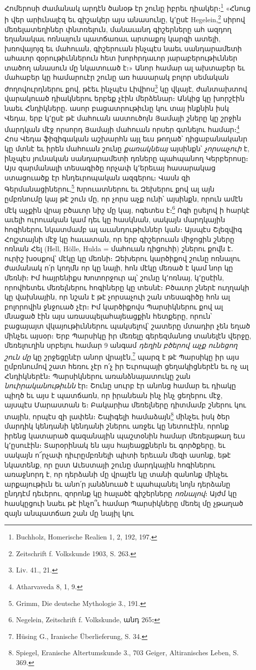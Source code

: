 \documentclass{article}
\begin{document}
{Հոմերոսի ժամանակ արդէն ծանօթ էր շունը իբրեւ դիակեր։\footnote{Buchholz, Homerische Realien 1, 2, 192, 197.} «Հնուց ի վեր արիւնալէզ եւ գիշակեր այս անասունը, կ՚ըսէ Hegelein,\footnote{Zeitschrift f. Volkskunde 1903, S. 263.} սիրով մեռելատեղիներ փնտռելուն, մանաւանդ գիշերները ահ ազդող եղանակաւ ոռնալուն պատճառաւ արտաքոյ կարգի ատելի, խռովայոյզ եւ մահուան, գիշերուան ինչպէս նաեւ սանդարամետի ահաւոր զօրութիւններուն հետ խորհրդաւոր յարաբերութիւններ տածող անասուն մը նկատուած է։» Անոր համար ալ ախտաբեր եւ մահաբեր կը համարուէր շունը առ հասարակ բոլոր սեմական ժողովուրդներու քով, թէեւ ինչպէս Լիվիոս\footnote{Liv. 41., 21.} կը վկայէ, ժանտախտով վարակուած դիակներու երբեք չէին մերձենար։ Անկից կը խորշէին նաեւ Հնդիկները․ ասոր բացատրութիւնը կու տայ ինքնին իսկ Վեդա, երբ կ՚ըսէ թէ մահուան աստուծոյն Յամայի շները կը շրջին մարդկան մէջ որսորդ Յամայի մահուան որսեր գտնելու համար։\footnote{Atharvaveda 8, 1, 9.} Հոս Վեդա ֆիզիգական աշխարհն այլ եւս թողած՝ դիցաբանականր կը մտնէ եւ իրեն մահուան շունը \emph{քառակնեայ} այսինքն՝ \emph{չորսաչուի} է, ինչպէս յունական սանդարամետի դռները պահպանող Կերբերոսը։ Այս զարմանալի տեսագիծը որչափ կ՚երեւայ հասարակաց ստացուածք էր հնդեւրոպական ազգերու։ Վասն զի Գերմանացիներու,\footnote{Grimm, Die deutsche Mythologie 3., 191.} Խրուատներու եւ Զեխերու քով ալ այն ըմբռնումը կայ թէ շուն մը, որ չորս աչք ունի՝ այսինքն, որուն ամէն մէկ աչքին վրայ բծաւոր նիշ մը կայ, ոգետես է։\footnote{Negelein, Zeitschrift f. Volkskunde, անդ 265։} Ոգի ըսելով ի հարկէ աւելի ուրուական կամ դեւ կը հասկնան, սակայն մարդկային հոգիներու նկատմամբ ալ աւանդութիւններ կան։ Այսպէս Շլեզվիգ Հոլշտայնի մէջ կը հաւատան, որ երբ գիշերուան միջոցին շները ոռնան Հել (Hell, Hölle, Hulda = մահուան դիցուհի) շներու քովն է․ ուրիշ խօսքով՝ մէկը կը մեռնի։ Զեխերու կարծիքով շունը ոռնալու ժամանակ ո՛ր կողմն որ կը նայի, հոն մէկը մեռած է կամ նոր կը մեռնի։ Իմ հայրենիքս Խոտորջուր ալ՝ շունը կ՚ոռնայ, կ՚ըսէին, որովհետեւ մեռելներու հոգիները կը տեսնէ։ Բծաւոր շներէ ուղղակի կը վախնային, որ նշան է թէ չորսաչուի շան տեսագիծը հոն ալ բոլորովին ջնջուած չէր։ Իմ կարծիքովս Պարսիկներու քով ալ մնացած էին այս առասպելահայեացքին հետքերը, որուն՝ բացայայտ վկայութիւններու պակսելով՝ շատերը մտադիր չեն եղած մինչեւ այսօր։ Երբ Պարսիկը իր մեռելը գերեզմանոց տանելէն վերջը, մեռելուղին սրբելու համար 9 անգամ \emph{դեղին բծերով աչք ունեցող շուն մը} կը շրջեցընէր անոր վրայէն,\footnote{Hüsing G., Iranische Überlieferung, S. 34.} պարզ է թէ Պարսիկը իր այս ըմբռնումով շատ հեռու չէր ո՛չ իր Եւրոպայի ցեղակիցներէն եւ ոչ ալ Հնդիկներէն։ Պարսիկներու առանձնայատուկը շան \emph{նուիրականութիւնն} էր։ Շունը սուրբ էր անոնց համար եւ դիակը պիղծ եւ այս է պատճառն, որ իրանեան ինչ ինչ ցեղերու մէջ, այսպէս Մարաստան ե։ Բակարիա մեռելները դիտմամբ շներու կու տային, որպէս զի լափեն։ Շպիգելի համաձայն\footnote{Spiegel, Eranische Altertumskunde 3., 703 Geiger, Altiranisches Leben, S. 369.} մինչեւ իսկ ծեր մարդիկ կենդանի կենդանի շներու առջեւ կը նետուէին, որոնք իրենց կատարած գազանային պաշտօնին համար մեռելաթաղ եւս կ՚ըսուէին։ Տարօրինակ են այս հայեացքներն եւ գործքերը, եւ սակայն ո՜րչափ դիւրըմբռնելի պիտի երեւան մեզի ասոնք, եթէ նկատենք, որ ըստ Աւեստայի շունը մարդկային հոգիներու առաջնորդ է, որ դերձանի մը վրայէն կը տանի զանոնք մինչեւ արքայութիւն եւ անո՛ր յանձնուած է պահպանել նոյն դերձանը ընդդէմ դեւերու, զորոնք կը հալածէ գիշերները \emph{ոռնալով}։ Այժմ կը հասկըցուի նաեւ թէ ինչո՞ւ համար Պարսիկները մեռել մը չթաղած զայն անպատճառ շան մը նայիլ կու }
\end{document}
